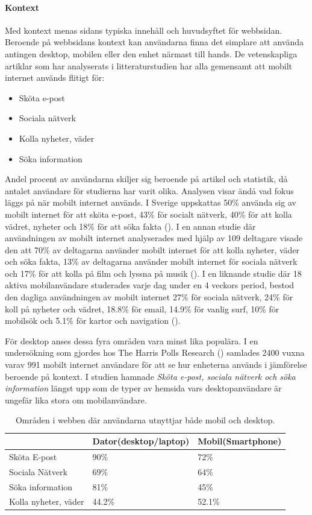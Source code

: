 \documentclass[11pt]{article}
\begin{document}
\paragraph{Kontext}\mbox{}

Med kontext menas sidans typiska innehåll och huvudsyftet för webbsidan. Beroende på webbsidans kontext kan användarna finna det simplare att använda antingen desktop, mobilen eller den enhet närmast till hands. De vetenskapliga artiklar som har analyserats i litteraturstudien har alla gemensamt att mobilt internet används flitigt för:

\begin{itemize}
	\item{Sköta e-post}
	\item{Sociala nätverk}
	\item{Kolla nyheter, väder}
	\item{Söka information}
\end{itemize}
\bigskip
Andel procent av användarna skiljer sig beroende på artikel och statistik, då antalet användare för studierna har varit olika. Analysen visar ändå vad fokus läggs på när mobilt internet används. I Sverige uppskattas  50\% använda sig av mobilt internet för att sköta e-post, 43\% för socialt nätverk, 40\% för att kolla vädret, nyheter och 18\% för att söka fakta (\cite[s. 25]{.se}). I en annan studie där användningen av mobilt internet analyserades med hjälp av 109 deltagare visade den att 70\% av deltagarna använder mobilt internet för att kolla nyheter, väder och söka fakta, 13\% av deltagarna använder mobilt internet för sociala nätverk och 17\% för att kolla på film och lyssna på musik (\cite{usageusability2}). I en liknande studie där 18 aktiva mobilanvändare studerades varje dag under en 4 veckors period, bestod den dagliga användningen av mobilt internet 27\% för sociala nätverk, 24\% för koll på nyheter och vädret, 18.8\% för email, 14.9\% för vanlig surf, 10\% för mobilsök och 5.1\% för kartor och navigation (\cite{mobilewebsearch}).

För desktop anses dessa fyra områden vara minst lika populära. I en undersökning som gjordes hos The Harris Polls Research (\cite{harrispoll}) samlades 2400 vuxna varav 991 mobilt internet användare för att se hur enheterna används i jämförelse beroende på kontext. I studien hamnade \textit{Sköta e-post, sociala nätverk och söka information} längst upp som de typer av hemsida vars desktopanvändare är ungefär lika stora om mobilanvändare.
\\
\begin{table}[H]
	\centering
	\begin{tabular}{|p{4cm}|p{4cm}|p{4cm}|}
	\hline
	~&Dator(desktop/laptop)&Mobil(Smartphone)\\ \hline
	Sköta E-post &90\%&72\%\\ \hline
	Sociala Nätverk&69\%&64\%\\ \hline
	Söka information&81\%&45\%\\ \hline
	Kolla nyheter, väder&44.2\%&52.1\%\\ \hline
	\end{tabular}
    \caption {Områden i webben där användarna utnyttjar både mobil och desktop.}
\end{table}
\end{document}
